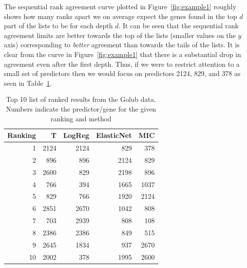 \documentclass[12pt,a4paper]{article}
\theoremstyle{plain}
\begin{document}
The sequential rank agreement curve plotted in Figure~\ref{fig:example1}
roughly shows how many ranks apart we on average expect the genes found in the
top $d$ part of the lists to be for each depth $d$.  It can be seen
that the sequential rank agreement limits are better towards the top
of the lists (smaller values on the $y$ axis) corresponding to
\emph{better} agreement than towards the tails of the lists. It is clear
from the curve in Figure~\ref{fig:example1} that there is a
substantial drop in agreement even after the first depth. Thus, if we
were to restrict attention to a small set of predictors then we would
focus on predictors 2124, 829, and 378 as seen in Table~\ref{tab1}.


\begin{table}[tb]
\centering
\caption{Top 10 list of ranked results from the Golub data. Numbers indicate the predictor/gene for the given ranking and method} 
\label{tab1}
\begin{tabular}{rrrrr}
  \hline
Ranking & T & LogReg & ElasticNet & MIC \\ 
  \hline
1 & 2124 & 2124 & 829 & 378 \\ 
  2 & 896 & 896 & 2124 & 829 \\ 
  3 & 2600 & 829 & 2198 & 896 \\ 
  4 & 766 & 394 & 1665 & 1037 \\ 
  5 & 829 & 766 & 1920 & 2124 \\ 
  6 & 2851 & 2670 & 1042 & 808 \\ 
  7 & 703 & 2939 & 808 & 108 \\ 
  8 & 2386 & 2386 & 849 & 515 \\ 
  9 & 2645 & 1834 & 937 & 2670 \\ 
  10 & 2002 & 378 & 1995 & 2600 \\ 
   \hline
\end{tabular}
\end{table}

\end{document}
